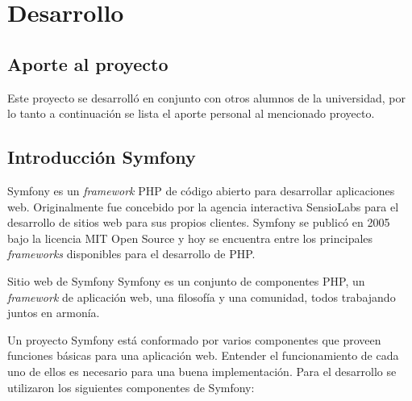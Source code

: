 
\section{Desarrollo}%
\label{sec:desarrollo}

\subsection{Aporte al proyecto}%
\label{ssub:aporte_al_proyecto}
Este proyecto se desarrolló en conjunto con otros alumnos de la universidad, por lo tanto a continuación se lista el aporte personal al mencionado proyecto.



\subsection{Introducción Symfony}%
\label{ssub:introduccion_symfony}
Symfony es un \textit{framework} PHP de código abierto para desarrollar aplicaciones web. Originalmente fue concebido por la
agencia interactiva SensioLabs para el desarrollo de sitios web para sus propios clientes. Symfony se publicó en 2005 bajo
la licencia MIT Open Source y hoy se encuentra entre los principales \textit{frameworks} disponibles para el desarrollo de PHP. \textcite{symfony-def}
\begin{aquote}{Sitio web de Symfony}
Symfony es un conjunto de componentes PHP, un \textit{framework} de aplicación web, una filosofía y una comunidad, todos trabajando juntos en armonía.
\end{aquote}
Un proyecto Symfony está conformado por varios componentes que proveen funciones básicas para una aplicación web. Entender
el funcionamiento de cada uno de ellos es necesario para una buena implementación. Para el desarrollo se utilizaron los siguientes componentes de Symfony:


\begin{itemize}
    
\end{itemize}
\newpage





\newpage


\newpage


